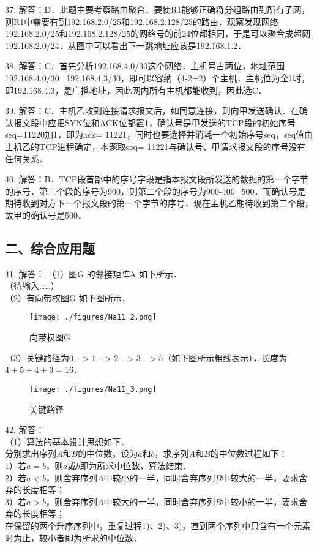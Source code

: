 37. 解答：D．此题主要考察路由聚合．要使R1能够正确将分组路由到所有子网，则R1中需要有到192.168.2.0/25和192.168.2.128/25的路由．观察发现网络192.168.2.0/25和192.168.2.128/25的网络号的前24位都相同，于是可以聚合成超网192.168.2.0/24．从图中可以看出下一跳地址应该是192.168.1.2．

38. 解答：C．首先分析192.168.4.0/30这个网络．主机号占两位，地址范围192.168.4.0/30~ 192.168.4.3/30，即可以容纳（4-2=2）个主机．主机位为全1时，即192.168.4.3，是广播地址，因此网内所有主机都能收到，因此选C．

39. 解答：C．主机乙收到连接请求报文后，如同意连接，则向甲发送确认．在确认报文段中应把SYN位和ACK位都置1，确认号是甲发送的TCP段的初始序号seq=11220加1，即为ack= 11221，同时也要选择并消耗一个初始序号seq，seq值由主机乙的TCP进程确定，本题取seq= 11221与确认号、甲请求报文段的序号没有任何关系．

40. 解答：B．TCP段首部中的序号字段是指本报文段所发送的数据的第一个字节的序号．第三个段的序号为900，则第二个段的序号为900-400=500．而确认号是期待收到对方下一个报文段的第一个字节的序号．现在主机乙期待收到第二个段，故甲的确认号是500．


\subsection{二、综合应用题}

41. 解答：
（1）图G 的邻接矩阵A 如下所示． \\
（待输入……） \\

（2）有向带权图G 如下图所示． \\
\begin{figure}[ht]
\centering
\texttt{[image: ./figures/Na11\_2.png]}
\caption{向带权图G} \label{Na11_fig2}
\end{figure}

（3）关键路径为$0->1->2->3->5$（如下图所示粗线表示），长度为$4+5+4+3=16$． \\
\begin{figure}[ht]
\centering
\texttt{[image: ./figures/Na11\_3.png]}
\caption{关键路径} \label{Na11_fig3}
\end{figure}

42. 解答： \\
（1）算法的基本设计思想如下． \\
分别求出序列$A$和$B$的中位数，设为$a$和$b$，求序列$A$和$B$的中位数过程如下： \\
1）若$a=b$，则$a$或$b$即为所求中位数，算法结束． \\
2）若$a<b$，则舍弃序列$A$中较小的一半，同时舍弃序列$B$中较大的一半，要求舍弃的长度相等； \\
3）若$a>b$，则舍弃序列$A$中较大的一半，同时舍弃序列$B$中较小的一半，要求舍弃的长度相等； \\
在保留的两个升序序列中，重复过程1)、2)、3)，直到两个序列中只含有一个元素时为止，较小者即为所求的中位数．

